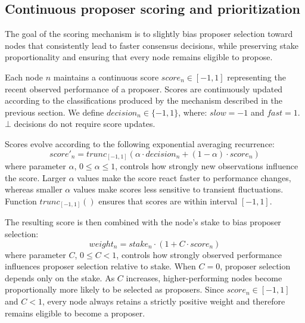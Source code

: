 
\subsection{Continuous proposer scoring and prioritization}
\label{subsec:scores}

The goal of the scoring mechanism is to slightly bias proposer selection toward nodes that consistently lead to faster consensus decisions, while preserving stake proportionality and ensuring that every node remains eligible to propose.

Each node $n$ maintains a continuous score $score_n \in [-1,1]$ representing the recent observed performance of a proposer. 
Scores are continuously updated according to the classifications produced by the mechanism described in the previous section.
We define $decision_n \in \{-1,1\}$, where: $slow = -1$ and $fast = 1$. $\bot$ decisions do not require score updates. 


Scores evolve according to the following exponential averaging recurrence:
\[
score'_n = trunc_{[-1,1]}(\alpha \cdot decision_n + (1-\alpha) \cdot score_n)
\]
where parameter $\alpha$, $0 \leq \alpha \leq 1$, controls how strongly new observations influence the score.  
Larger $\alpha$ values make the score react faster to performance changes, whereas smaller $\alpha$ values make scores less sensitive to transient fluctuations.
Function $trunc_{[-1,1]}()$ ensures that scores are within interval $[-1,1]$.

The resulting score is then combined with the node's stake to bias proposer selection:
\[
weight_n = stake_n \cdot (1 + C \cdot score_n)
\]
where parameter $C$, $0 \leq C < 1$, controls how strongly observed performance influences proposer selection relative to stake. 
When $C = 0$, proposer selection depends only on the stake. 
As $C$ increases, higher-performing nodes become proportionally more likely to be selected as proposers. 
Since $score_n \in [-1,1]$ and $C < 1$, every node always retains a strictly positive weight and therefore remains eligible to become a proposer.

